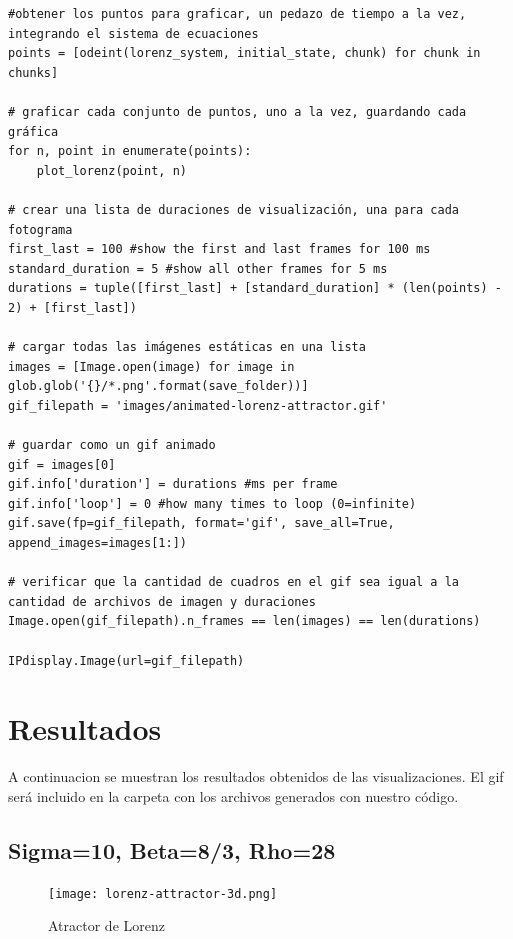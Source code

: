 \documentclass[12pt]{article}
\begin{document}
\begin{verbatim}
#obtener los puntos para graficar, un pedazo de tiempo a la vez, integrando el sistema de ecuaciones
points = [odeint(lorenz_system, initial_state, chunk) for chunk in chunks]

# graficar cada conjunto de puntos, uno a la vez, guardando cada gráfica
for n, point in enumerate(points):
    plot_lorenz(point, n)

# crear una lista de duraciones de visualización, una para cada fotograma
first_last = 100 #show the first and last frames for 100 ms
standard_duration = 5 #show all other frames for 5 ms
durations = tuple([first_last] + [standard_duration] * (len(points) - 2) + [first_last])

# cargar todas las imágenes estáticas en una lista
images = [Image.open(image) for image in glob.glob('{}/*.png'.format(save_folder))]
gif_filepath = 'images/animated-lorenz-attractor.gif'

# guardar como un gif animado
gif = images[0]
gif.info['duration'] = durations #ms per frame
gif.info['loop'] = 0 #how many times to loop (0=infinite)
gif.save(fp=gif_filepath, format='gif', save_all=True, append_images=images[1:])

# verificar que la cantidad de cuadros en el gif sea igual a la cantidad de archivos de imagen y duraciones
Image.open(gif_filepath).n_frames == len(images) == len(durations)

IPdisplay.Image(url=gif_filepath)

\end{verbatim}

\section{Resultados}

A continuacion se muestran los resultados obtenidos de las visualizaciones. El gif será incluido en la carpeta con los archivos generados con nuestro código.

\subsection{Sigma=10, Beta=8/3, Rho=28}

\begin{figure}
\begin{centering}
  \texttt{[image: lorenz-attractor-3d.png]}
  \caption{Atractor de Lorenz}
\end{centering}
\end{figure}
\end{document}
